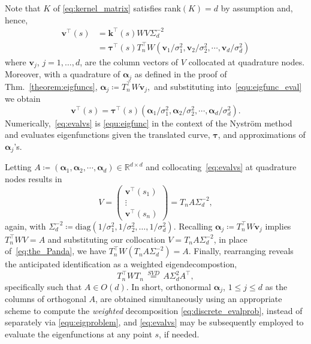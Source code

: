 \documentclass[pdflatex,iicol]{sn-jnl}%
\theoremstyle{thmstyleone}%
\theoremstyle{thmstyletwo}%
\theoremstyle{thmstylethree}%
\begin{document}
Note that $K$ of \eqref{eq:kernel_matrix} satisfies rank$(K) =d$ by assumption and, hence, 
\begin{align} \label{equ:eigfunc_eval}
    \boldsymbol{v}^{\top}( s) &=\mathbf{k}^{\top}(s) W V\Sigma^{-2}_d\\ \nonumber
        &=\boldsymbol{\tau}^{\top}(s)T_n^{\top}W(\mathbf{v}_1/\sigma_1^2, \mathbf{v}_2/\sigma_2^2, \cdots , \mathbf{v}_d /\sigma_d^2) \nonumber
\end{align}
where $\mathbf{v}_j$, $j=1,\dots,d$, are the column vectors of $V$ collocated at quadrature nodes. Moreover, with a quadrature of $\boldsymbol \alpha_j$ as defined in the proof of Thm.~\ref{theorem:eigfuncs},
$
\boldsymbol{\alpha}_j \coloneqq T_n^{\top}W \mathbf{v}_j,
$
and substituting into~\eqref{equ:eigfunc_eval} we obtain 
\begin{equation}\label{eq:evalvs}
\boldsymbol{v}^{\top}( s) = \boldsymbol{\tau}^{\top}(s) (\boldsymbol \alpha_1/\sigma_1^2,  \boldsymbol \alpha_2/\sigma_2^2, \cdots , \boldsymbol \alpha_d /\sigma_d^2).
\end{equation}
Numerically,~\eqref{eq:evalvs} is \eqref{equ:eigfunc} in the context of the Nystr\"om method and evaluates eigenfunctions given the translated curve, $\boldsymbol{\tau}$, and approximations of $\boldsymbol{\alpha}_j$'s. 

Letting $A \coloneqq (\boldsymbol{\alpha}_1,\boldsymbol{\alpha}_2,\cdots,\boldsymbol{\alpha}_d)\in \mathbb{R}^{d \times d}$ and collocating~\eqref{eq:evalvs} at quadrature nodes results in
$$
V = \left( \begin{matrix}
    \boldsymbol{v}^{\top}(s_1)\\
    \vdots\\
    \boldsymbol{v}^{\top}(s_n)
\end{matrix} \right) = T_n A \Sigma_d^{-2},
$$
again, with $\Sigma_d^{-2} \coloneqq \text{diag}(1/\sigma_1^2, 1/\sigma_2^2 , \dots, 1/\sigma^2_d)$. Recalling $
\boldsymbol{\alpha}_j \coloneqq T_n^{\top}W \mathbf{v}_j
$
implies
$
T_n^{\top} W V = A
$
and substituting our collocation $V = T_n A \Sigma_d^{-2}$, in place of~\eqref{eq:the_Panda}, we have
$
T_n^{\top}W(T_nA \Sigma_d^{-2}) = A.
$
Finally, rearranging reveals the anticipated identification as a weighted eigendecompostion,
\begin{equation}\label{eq:discrete_evalprob}
T^{\top}_nWT_n \,\overset{SVD}{=}\, A\Sigma^2_dA^{\top},
\end{equation}
specifically such that $A \in O(d)$. In short, orthonormal $\boldsymbol \alpha_j$, $1\leq j \leq d$ as the columns of orthogonal $A$, are obtained simultaneously using an appropriate scheme to compute the \emph{weighted} decomposition \eqref{eq:discrete_evalprob}, instead of separately via \eqref{equ:eigproblem}, and \eqref{eq:evalvs} may be subsequently employed to evaluate the eigenfunctions at any point $s$, if needed. 
\end{document}
